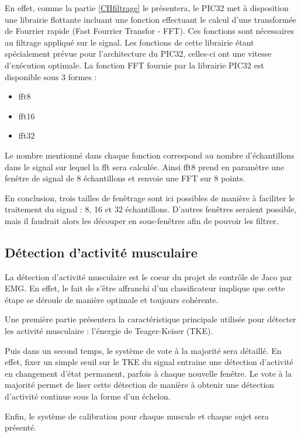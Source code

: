 \documentclass[letterpaper, twoside, 12pt, memoire, creativecommons, hyperref]{thETS}
\begin{document}
En effet, comme la partie \ref{CHfiltrage} le présentera, le PIC32 met à disposition une librairie flottante incluant une fonction effectuant le calcul d'une transformée de Fourrier rapide (Fast Fourrier Transfor - FFT). Ces fonctions sont nécessaires au filtrage appliqué sur le signal. Les fonctions de cette librairie étant spécialement prévue pour l'architecture du PIC32, celles-ci ont une vitesse d'exécution optimale. La fonction FFT fournie par la librairie PIC32 est disponible sous 3 formes : 

\begin{itemize}
 \item fft8
 \item fft16
 \item fft32
\end{itemize}

Le nombre mentionné dans chaque fonction correspond au nombre d'échantillons dans le signal sur lequel la fft sera calculée. Ainsi fft8 prend en paramètre une fenêtre de signal de 8 échantillons et renvoie une FFT sur 8 points.

En conclusion, trois tailles de fenêtrage sont ici possibles de manière à faciliter le traitement du signal : 8, 16 et 32 échantillons. D'autres fenêtres seraient possible, mais il faudrait alors les découper en sous-fenêtres afin de pouvoir les filtrer. 

\subsection{Détection d'activité musculaire}

La détection d'activité musculaire est le coeur du projet de contrôle de Jaco par EMG. En effet, le fait de s'être affranchi d'un classificateur implique que cette étape se déroule de manière optimale et toujours cohérente.

Une première partie présentera la caractéristique principale utilisée pour détecter les activité musculaire : l'énergie de Teager-Keiser (TKE). 

Puis dans un second temps, le système de vote à la majorité sera détaillé. En effet, fixer un simple seuil sur le TKE du signal entraine une détection d'activité en changement d'état permanent, parfois à chaque nouvelle fenêtre. Le vote à la majorité permet de liser cette détection de manière à obtenir une détection d'activité continue sous la forme d'un échelon.

Enfin, le système de calibration pour chaque muscule et chaque sujet sera présenté.
\end{document}
